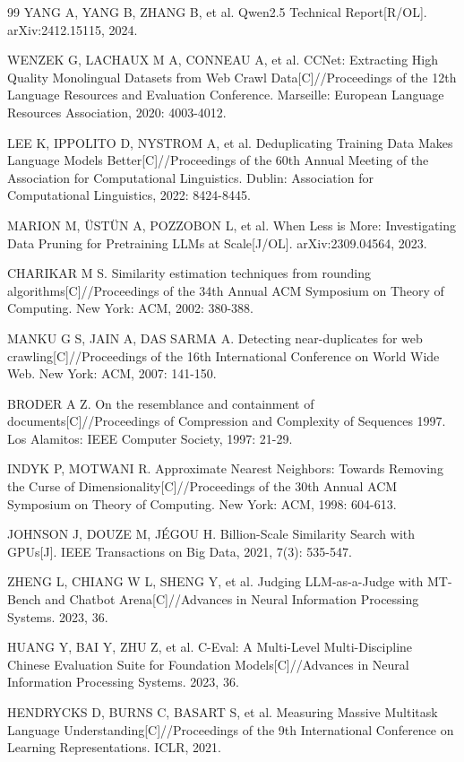 \documentclass[fontset=fandol,type=master,campus=shenzhen,etitleauto=true]{hithesisbook}
\begin{document}
\begin{thebibliography}{99}
 YANG A, YANG B, ZHANG B, et al. Qwen2.5 Technical Report[R/OL]. arXiv:2412.15115, 2024.

 WENZEK G, LACHAUX M A, CONNEAU A, et al. CCNet: Extracting High Quality Monolingual Datasets from Web Crawl Data[C]//Proceedings of the 12th Language Resources and Evaluation Conference. Marseille: European Language Resources Association, 2020: 4003-4012.

 LEE K, IPPOLITO D, NYSTROM A, et al. Deduplicating Training Data Makes Language Models Better[C]//Proceedings of the 60th Annual Meeting of the Association for Computational Linguistics. Dublin: Association for Computational Linguistics, 2022: 8424-8445.

 MARION M, ÜSTÜN A, POZZOBON L, et al. When Less is More: Investigating Data Pruning for Pretraining LLMs at Scale[J/OL]. arXiv:2309.04564, 2023.

 CHARIKAR M S. Similarity estimation techniques from rounding algorithms[C]//Proceedings of the 34th Annual ACM Symposium on Theory of Computing. New York: ACM, 2002: 380-388.

 MANKU G S, JAIN A, DAS SARMA A. Detecting near-duplicates for web crawling[C]//Proceedings of the 16th International Conference on World Wide Web. New York: ACM, 2007: 141-150.

 BRODER A Z. On the resemblance and containment of documents[C]//Proceedings of Compression and Complexity of Sequences 1997. Los Alamitos: IEEE Computer Society, 1997: 21-29.

 INDYK P, MOTWANI R. Approximate Nearest Neighbors: Towards Removing the Curse of Dimensionality[C]//Proceedings of the 30th Annual ACM Symposium on Theory of Computing. New York: ACM, 1998: 604-613.

 JOHNSON J, DOUZE M, JÉGOU H. Billion-Scale Similarity Search with GPUs[J]. IEEE Transactions on Big Data, 2021, 7(3): 535-547.

 ZHENG L, CHIANG W L, SHENG Y, et al. Judging LLM-as-a-Judge with MT-Bench and Chatbot Arena[C]//Advances in Neural Information Processing Systems. 2023, 36.

 HUANG Y, BAI Y, ZHU Z, et al. C-Eval: A Multi-Level Multi-Discipline Chinese Evaluation Suite for Foundation Models[C]//Advances in Neural Information Processing Systems. 2023, 36.

 HENDRYCKS D, BURNS C, BASART S, et al. Measuring Massive Multitask Language Understanding[C]//Proceedings of the 9th International Conference on Learning Representations. ICLR, 2021.


\end{thebibliography}
\end{document}
